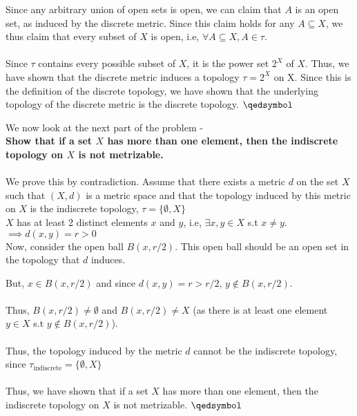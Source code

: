 \begin{frame}
    Since any arbitrary union of open sets is open, we can claim that $A$ is an open set, as induced by the discrete metric. Since this claim holds for any $A \subseteq X$, we thus claim that every subset of $X$ is open, i.e, $\forall A \subseteq X, A \in \tau$.\\\\
    \pause
    Since $\tau$ contains every possible subset of $X$, it is the power set $2^X$ of $X$. Thus, we have shown that the discrete metric induces a topology $\tau = 2^X$ on X. Since this is the definition of the discrete topology, we have shown that the underlying topology of the discrete metric is the discrete topology. $\qedsymbol$
\end{frame}

\begin{frame}
    We now look at the next part of the problem - \\
    \textbf{Show that if a set $X$ has more than one element, then the indiscrete topology on $X$ is not metrizable.}\\\\
    \pause
    We prove this by contradiction. Assume that there exists a metric $d$ on the set $X$ such that $(X,d)$ is a metric space and that the topology induced by this metric on $X$ is the indiscrete topology, $\tau = \{ \emptyset , X \}$\\
    \pause
    $X$ has at least 2 distinct elements $x$ and $y$, i.e, $\exists x,y \in X$ s.t $x \neq y$. \\
    $\implies d(x,y) = r > 0$ \\
    \pause
    Now, consider the open ball $B(x,r/2)$. This open ball should be an open set in the topology that $d$ induces.
\end{frame}

\begin{frame}
    But, $x \in B(x,r/2)$ and since $d(x,y) = r > r/2$, $y \notin B(x,r/2)$. \\\\
    \pause
    Thus, $B(x,r/2) \neq \emptyset$ and $B(x,r/2) \neq X$ (as there is at least one element $y \in X$ s.t $y \notin B(x,r/2)$).\\\\
    \pause
    Thus, the topology induced by the metric $d$ cannot be the indiscrete topology, since $\tau_{\text{indiscrete}} = \{\emptyset, X\}$\\\\
    \pause
    Thus, we have shown that if a set $X$ has more than one element, then the indiscrete topology on $X$ is not metrizable. $\qedsymbol$
\end{frame}
